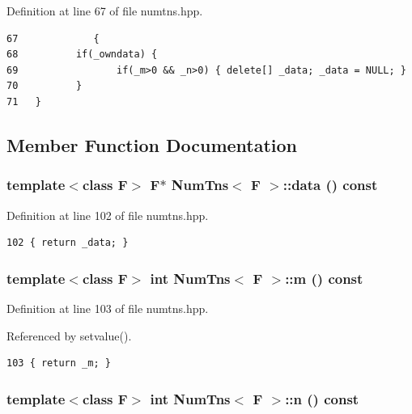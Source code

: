 Definition at line 67 of file numtns.hpp.

\footnotesize\begin{verbatim}67             { 
68          if(_owndata) { 
69                 if(_m>0 && _n>0) { delete[] _data; _data = NULL; } 
70          }
71   }
\end{verbatim}\normalsize 




\subsection{Member Function Documentation}
\subsubsection{\setlength{\rightskip}{0pt plus 5cm}template$<$class F$>$ F$\ast$ {\bf Num\-Tns}$<$ F $>$::data () const\hspace{0.3cm}{\tt  [inline]}}\label{classNumTns_ad3b2b9598c8547b4f7afe7a79ed520c_ad3b2b9598c8547b4f7afe7a79ed520c}




Definition at line 102 of file numtns.hpp.

\footnotesize\begin{verbatim}102 { return _data; }
\end{verbatim}\normalsize 


\subsubsection{\setlength{\rightskip}{0pt plus 5cm}template$<$class F$>$ int {\bf Num\-Tns}$<$ F $>$::m () const\hspace{0.3cm}{\tt  [inline]}}\label{classNumTns_6a2fa69c25bf8ed36e019d0fb3f5e966_6a2fa69c25bf8ed36e019d0fb3f5e966}




Definition at line 103 of file numtns.hpp.

Referenced by setvalue().

\footnotesize\begin{verbatim}103 { return _m; }
\end{verbatim}\normalsize 


\subsubsection{\setlength{\rightskip}{0pt plus 5cm}template$<$class F$>$ int {\bf Num\-Tns}$<$ F $>$::n () const\hspace{0.3cm}{\tt  [inline]}}\label{classNumTns_611a0b095fab035a528671dd8cf7f3b7_611a0b095fab035a528671dd8cf7f3b7}




